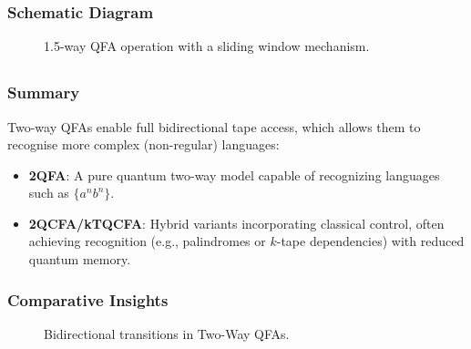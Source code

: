 \subsubsection{Schematic Diagram}
\begin{figure}[ht]
\centering
{}
\caption{1.5-way QFA operation with a sliding window mechanism.}
\label{fig:1.5qfa}
\end{figure}

\subsection*{}

\subsubsection{Summary}
Two-way QFAs enable full bidirectional tape access, which allows them to recognise more complex (non-regular) languages:
\begin{itemize}
    \item \textbf{2QFA}: A pure quantum two-way model capable of recognizing languages such as $\{a^nb^n\}$.
    \item \textbf{2QCFA/kTQCFA}: Hybrid variants incorporating classical control, often achieving recognition (e.g., palindromes or $k$-tape dependencies) with reduced quantum memory.
\end{itemize}

\subsubsection{Comparative Insights}
\begin{figure}[ht]
\centering
{}
\caption{Bidirectional transitions in Two-Way QFAs.}
\label{fig:two_way}
\end{figure}

